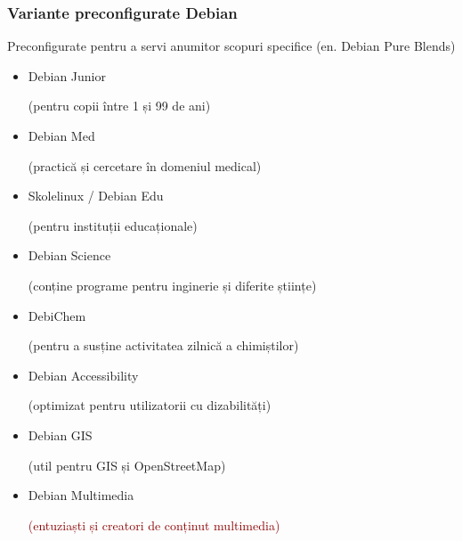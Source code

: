 \documentclass[xcolor=dvipsnames]{beamer}
\begin{document}
\begin{frame}
\frametitle{Variante preconfigurate Debian}
\begin{block}
{Preconfigurate pentru a servi anumitor scopuri specifice}
(en. Debian Pure Blends)\\
\begin{itemize}
\item Debian Junior
	\begin{footnotesize}
		(pentru copii între 1 și 99 de ani)
	\end{footnotesize} 
\item Debian Med
	\begin{footnotesize}
		(practică și cercetare în domeniul medical)
	\end{footnotesize} 
\item Skolelinux / Debian Edu
	\begin{footnotesize}
		(pentru instituții educaționale)
	\end{footnotesize} 
\item Debian Science
	\begin{footnotesize}
		(conține programe pentru inginerie și diferite științe)
	\end{footnotesize} 
\item DebiChem
	\begin{footnotesize}
		(pentru a susține activitatea zilnică a chimiștilor)
	\end{footnotesize} 
\item Debian Accessibility
	\begin{footnotesize}
		(optimizat pentru utilizatorii cu dizabilități)
	\end{footnotesize} 
\item Debian GIS
	\begin{footnotesize}
		(util pentru GIS și OpenStreetMap)
	\end{footnotesize} 
\item Debian Multimedia
	\begin{footnotesize}
		\textcolor{darkred}{(entuziaști și creatori de conținut multimedia)}
	\end{footnotesize} 
\end{itemize}
\end{block}
\end{frame}
\end{document}
